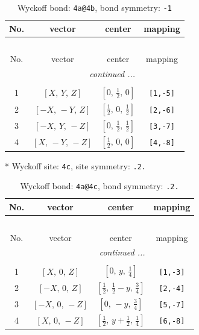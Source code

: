 \documentclass[fleqn,8pt]{jsarticle}
\begin{document}
\begin{longtable}{cccc}
\caption{Wyckoff bond: {\tt 4a@4b}, bond symmetry: {\tt -1}}
 \\
 \hline \hline
No. & vector & center & mapping \\ \hline \endfirsthead

\multicolumn{3}{l}{\tablename\ \thetable{}} \\
 \hline \hline
No. & vector & center & mapping \\ \hline \endhead

 \hline \hline
\multicolumn{3}{r}{\footnotesize\it continued ...} \\ \endfoot

 \hline \hline
\multicolumn{3}{r}{} \\ \endlastfoot

1 & $\left[ X,\, Y,\, Z \right]$ & $\left[ 0,\, \frac{1}{2},\, 0 \right]$ & {\tt [1,-5]} \\ \hline
2 & $\left[ - X,\, - Y,\, Z \right]$ & $\left[ \frac{1}{2},\, 0,\, \frac{1}{2} \right]$ & {\tt [2,-6]} \\ \hline
3 & $\left[ - X,\, Y,\, - Z \right]$ & $\left[ 0,\, \frac{1}{2},\, \frac{1}{2} \right]$ & {\tt [3,-7]} \\ \hline
4 & $\left[ X,\, - Y,\, - Z \right]$ & $\left[ \frac{1}{2},\, 0,\, 0 \right]$ & {\tt [4,-8]} \\
\end{longtable}
* Wyckoff site: {\tt 4c}, site symmetry: {\tt .2.}
\renewcommand{\arraystretch}{1.2}
\begin{longtable}{cccc}
\caption{Wyckoff bond: {\tt 4a@4c}, bond symmetry: {\tt .2.}}
 \\
 \hline \hline
No. & vector & center & mapping \\ \hline \endfirsthead

\multicolumn{3}{l}{\tablename\ \thetable{}} \\
 \hline \hline
No. & vector & center & mapping \\ \hline \endhead

 \hline \hline
\multicolumn{3}{r}{\footnotesize\it continued ...} \\ \endfoot

 \hline \hline
\multicolumn{3}{r}{} \\ \endlastfoot

1 & $\left[ X,\, 0,\, Z \right]$ & $\left[ 0,\, y,\, \frac{1}{4} \right]$ & {\tt [1,-3]} \\ \hline
2 & $\left[ - X,\, 0,\, Z \right]$ & $\left[ \frac{1}{2},\, \frac{1}{2} - y,\, \frac{3}{4} \right]$ & {\tt [2,-4]} \\ \hline
3 & $\left[ - X,\, 0,\, - Z \right]$ & $\left[ 0,\, - y,\, \frac{3}{4} \right]$ & {\tt [5,-7]} \\ \hline
4 & $\left[ X,\, 0,\, - Z \right]$ & $\left[ \frac{1}{2},\, y + \frac{1}{2},\, \frac{1}{4} \right]$ & {\tt [6,-8]} \\
\end{longtable}
\end{document}
